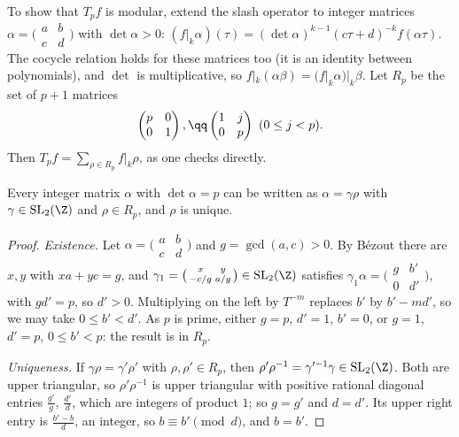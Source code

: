 To show that $T_pf$ is modular, extend the slash operator to integer matrices $\alpha=\bigl(\begin{smallmatrix}a&b\\c&d\end{smallmatrix}\bigr)$ with $\det\alpha>0$: $(f|_k\alpha)(\tau)=(\det\alpha)^{k-1}(c\tau+d)^{-k}f(\alpha\tau)$. The cocycle relation holds for these
matrices too (it is an identity between polynomials), and $\det$ is multiplicative, so $f|_k(\alpha\beta)=(f|_k\alpha)|_k\beta$. Let $R_p$ be the set of $p+1$ matrices
\[
\begin{pmatrix}p&0\\0&1\end{pmatrix},\qq\begin{pmatrix}1&j\\0&p\end{pmatrix}\ (0\le j<p).
\]
Then $T_pf=\sum_{\rho\in R_p}f|_k\rho$, as one checks directly.

\begin{lemma}\label{lem:hermite}
Every integer matrix $\alpha$ with $\det\alpha=p$ can be written as $\alpha=\gamma\rho$ with $\gamma\in\mathrm{SL}_2(\Z)$ and $\rho\in R_p$, and $\rho$ is unique.
\end{lemma}

\begin{proof}
\emph{Existence.} Let $\alpha=\bigl(\begin{smallmatrix}a&b\\c&d\end{smallmatrix}\bigr)$ and $g=\gcd(a,c)>0$. By Bézout there are $x,y$ with $xa+yc=g$, and $\gamma_1=\bigl(\begin{smallmatrix}x&y\\-c/g&a/g\end{smallmatrix}\bigr)\in\mathrm{SL}_2(\Z)$ satisfies
$\gamma_1\alpha=\bigl(\begin{smallmatrix}g&b'\\0&d'\end{smallmatrix}\bigr)$, with $gd'=p$, so $d'>0$. Multiplying on the left by $T^{-m}$ replaces $b'$ by $b'-md'$, so we may take $0\le b'<d'$. As $p$ is prime, either $g=p$, $d'=1$, $b'=0$,
or $g=1$, $d'=p$, $0\le b'<p$: the result is in $R_p$.

\emph{Uniqueness.} If $\gamma\rho=\gamma'\rho'$ with $\rho,\rho'\in R_p$, then $\rho'\rho^{-1}=\gamma'^{-1}\gamma\in\mathrm{SL}_2(\Z)$. Both are upper triangular, so $\rho'\rho^{-1}$ is upper triangular with positive rational diagonal entries $\frac{g'}g$, $\frac{d'}d$, which
are integers of product $1$; so $g=g'$ and $d=d'$. Its upper right entry is $\frac{b'-b}d$, an integer, so $b\equiv b'\pmod d$, and $b=b'$.
\end{proof}

